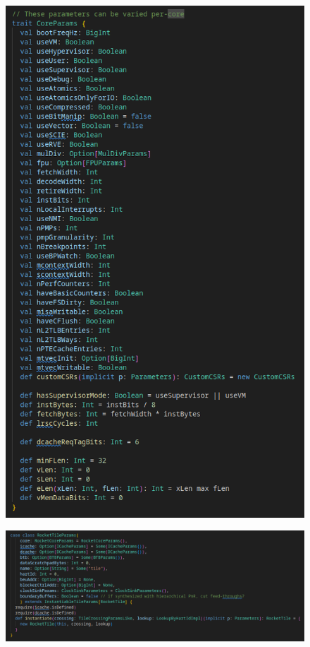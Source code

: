 \begin{figure}
    \includegraphics[]{./img/core_params.png}
\end{figure}
\begin{figure}
    \includegraphics[]{./img/rocket_tile_params.png}
\end{figure}

